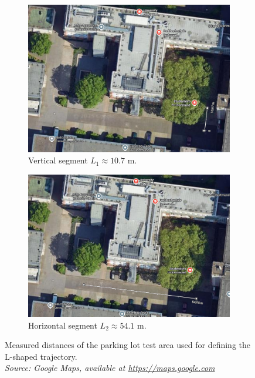 \begin{figure}[!htbp]
    \centering
    \begin{subfigure}{0.48\linewidth}
        \centering
        \includegraphics[width=\linewidth]{images/FH_ParkingLotL1.png}
        \caption{Vertical segment $L_1 \approx 10.7$ m.}
        \label{fig:parkinglot_l1}
    \end{subfigure}
    \hfill
    \begin{subfigure}{0.48\linewidth}
        \centering
        \includegraphics[width=\linewidth]{images/FH_ParkingLotL2.png}
        \caption{Horizontal segment $L_2 \approx 54.1$ m.}
        \label{fig:parkinglot_l2}
    \end{subfigure}
    \caption{Measured distances of the parking lot test area used for defining the L-shaped trajectory.\\
    \textit{Source: Google Maps, available at \url{https://maps.google.com} \cite{googlemaps_fhdo}}}
    \label{fig:parkinglot_measurements}
\end{figure}

